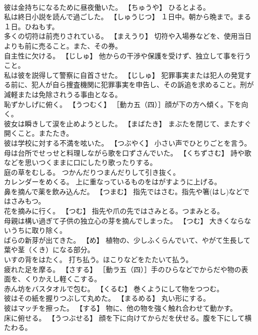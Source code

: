 \documentclass[8pt]{extreport}
\begin{document}
\begin{CJK}{UTF8}{min}
\\	彼は金持ちになるために昼夜働いた。	【ちゅうや】 ひるとよる。
\\	私は終日小説を読んで過ごした。	【しゅうじつ】 １日中。朝から晩まで。まる１日。ひねもす。
\\	多くの切符は前売りされている。	【まえうり】 切符や入場券などを、使用当日よりも前に売ること。また、その券。
\\	自主性に欠ける。	【じしゅ】 他からの干渉や保護を受けず、独立して事を行うこと。
\\	私は彼を説得して警察に自首させた。	【じしゅ】 犯罪事実または犯人の発覚する前に、犯人が自ら捜査機関に犯罪事実を申告し、その訴追を求めること。刑が減軽または免除されうる事由となる。
\\	恥ずかしげに俯く。	【うつむく】 ［動カ五（四）］顔が下の方へ傾く。下を向く。
\\	彼女は瞬きして涙を止めようとした。	【まばたき】 まぶたを閉じて、またすぐ開くこと。またたき。
\\	彼は学校に対する不満を呟いた。	【つぶやく】 小さい声でひとりごとを言う。
\\	母は台所でせっせと料理しながら歌を口ずさんでいた。	【くちずさむ】 詩や歌などを思いつくままに口にしたり歌ったりする。
\\	庭の草をむしる。	つかんだりつまんだりして引き抜く。
\\	カレンダーをめくる。	上に重なっているものをはがすように上げる。
\\	鼻を摘んで薬を飲み込んだ。	【つまむ】 指先ではさむ。指先や箸(はし)などではさみもつ。
\\	花を摘みに行く。	【つむ】 指先や爪の先ではさみとる。つまみとる。
\\	母親は構い過ぎて子供の独立心の芽を摘んでしまった。	【つむ】 大きくならないうちに取り除く。
\\	ばらの新芽が出てきた。	【め】 植物の、少しふくらんでいて、やがて生長して葉や茎（くき）になる部分。
\\	いすの背をはたく。	打ち払う。ほこりなどをたたいて払う。
\\	疲れた足を摩る。	【さする】 ［動ラ五（四）］手のひらなどでからだや物の表面を、くりかえし軽くこする。
\\	赤ん坊をバスタオルで包む。	【くるむ】 巻くようにして物をつつむ。
\\	彼はその紙を握りつぶして丸めた。	【まるめる】 丸い形にする。
\\	彼はマッチを擦った。	【する】 物に、他の物を強く触れ合わせて動かす。
\\	床に俯せる。	【うつぶせる】 顔を下に向けてからだを伏せる。腹を下にして横たわる。

\end{CJK}
\end{document}
